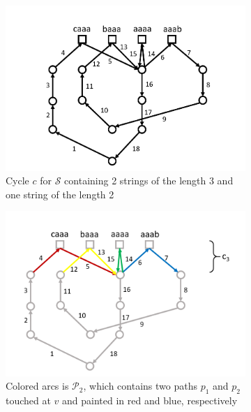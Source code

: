 \documentclass[11pt]{article}
\begin{document}
	\begin{figure}[h]
		\centering
		\begin{subfigure}[t]{0.3\textwidth}
			\includegraphics[width=\textwidth]{gha_is_greedy_img/fig1.png}
			\caption{Cycle $c$ for $\mathcal{S}$ containing 2 strings of the length 3 and one string of the length 2}
			\label{fig:1a}
		\end{subfigure}
		\hfil
		\begin{subfigure}[t]{0.3\textwidth}
			\includegraphics[width=\textwidth]{gha_is_greedy_img/fig2.png}
			\caption{Colored arcs is $\mathcal{P}_2$, which contains two paths $p_1$ and $p_2$ touched at $v$ and painted in red and blue, respectively}
			\label{fig:1b}
		\end{subfigure}
		\hfil
		\begin{subfigure}[t]{0.3\textwidth}

\end{subfigure}
\end{figure}
\end{document}
